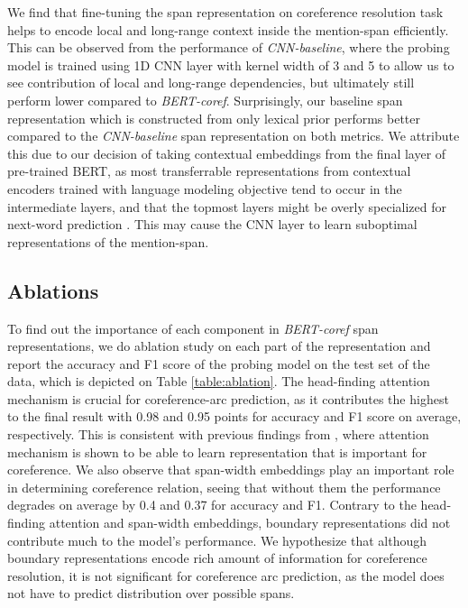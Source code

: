 \documentclass[11pt]{article}
\begin{document}
We find that fine-tuning the span representation on coreference resolution task helps to encode local and long-range context inside the mention-span efficiently. This can be observed from the performance of \textit{CNN-baseline}, where the probing model is trained using 1D CNN layer with kernel width of 3 and 5 to allow us to see contribution of local and long-range dependencies, but ultimately still perform lower compared to \textit{BERT-coref}. Surprisingly, our baseline span representation which is constructed from only lexical prior performs better compared to the \textit{CNN-baseline} span representation on both metrics. We attribute this due to our decision of taking contextual embeddings from the final layer of pre-trained BERT, as most transferrable representations from contextual encoders trained with language modeling objective tend to occur in the intermediate layers, and that the topmost layers might be overly specialized for next-word prediction \parencite{liu2019linguistic,peters2018elmo,peters-etal-2018-dissecting,blevins-etal-2018-deep,devlin2019bert}. This may cause the CNN layer to learn suboptimal representations of the mention-span.

\subsection{Ablations}
To find out the importance of each component in \textit{BERT-coref} span representations, we do ablation study on each part of the representation and report the accuracy and F1 score of the probing model on the test set of the data, which is depicted on Table \ref{table:ablation}. The head-finding attention mechanism is crucial for coreference-arc prediction, as it contributes the highest to the final result with 0.98 and 0.95 points for accuracy and F1 score on average, respectively. This is consistent with previous findings from \parencite{lee2017end}, where attention mechanism is shown to be able to learn representation that is important for coreference. We also observe that span-width embeddings play an important role in determining coreference relation, seeing that without them the performance degrades on average by 0.4 and 0.37 for accuracy and F1. Contrary to the head-finding attention and span-width embeddings, boundary representations did not contribute much to the model's performance. We hypothesize that although boundary representations encode rich amount of information for coreference resolution, it is not significant for coreference arc prediction, as the model does not have to predict distribution over possible spans.
\end{document}
